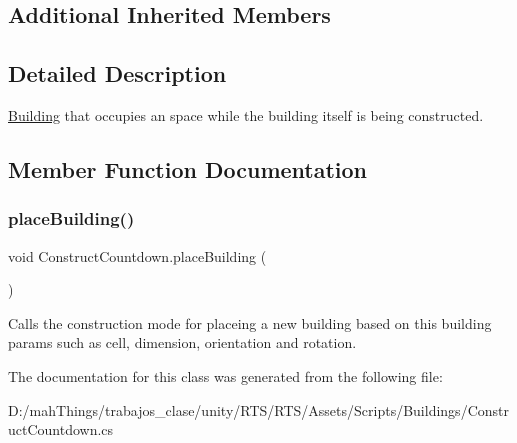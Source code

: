 \subsection*{Additional Inherited Members}


\subsection{Detailed Description}
\mbox{\hyperlink{class_building}{Building}} that occupies an space while the building itself is being constructed. 



\subsection{Member Function Documentation}
\mbox{\label{class_construct_countdown_aa9aabcf5c7c48fd7f75a7ab0ecfdef42}} 
\subsubsection{\texorpdfstring{place\+Building()}{placeBuilding()}}
{\footnotesize\ttfamily void Construct\+Countdown.\+place\+Building (\begin{DoxyParamCaption}{ }\end{DoxyParamCaption})}



Calls the construction mode for placeing a new building based on this building params such as cell, dimension, orientation and rotation. 



The documentation for this class was generated from the following file\+:\begin{DoxyCompactItemize}
\item 
D\+:/mah\+Things/trabajos\+\_\+clase/unity/\+R\+T\+S/\+R\+T\+S/\+Assets/\+Scripts/\+Buildings/Construct\+Countdown.\+cs\end{DoxyCompactItemize}

